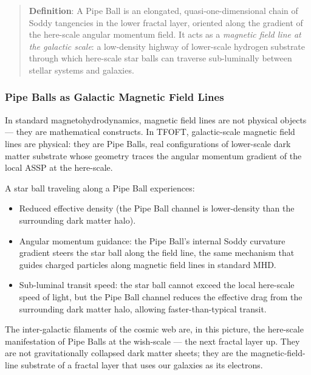   \begin{quote}
  \textbf{Definition}: A Pipe Ball is an elongated, quasi-one-dimensional chain
  of Soddy tangencies in the lower fractal layer, oriented along the gradient of
  the here-scale angular momentum field. It acts as a \emph{magnetic field line
  at the galactic scale}: a low-density highway of lower-scale hydrogen substrate
  through which here-scale star balls can traverse sub-luminally between stellar
  systems and galaxies.
  \end{quote}

  \subsubsection{Pipe Balls as Galactic Magnetic Field Lines}

    In standard magnetohydrodynamics, magnetic field lines are not physical objects
    --- they are mathematical constructs. In TFOFT, galactic-scale magnetic field
    lines are physical: they are Pipe Balls, real configurations of lower-scale
    dark matter substrate whose geometry traces the angular momentum gradient of
    the local ASSP at the here-scale.

    A star ball traveling along a Pipe Ball experiences:
    \begin{itemize}
      \item Reduced effective density (the Pipe Ball channel is lower-density than
            the surrounding dark matter halo).
      \item Angular momentum guidance: the Pipe Ball's internal Soddy curvature
            gradient steers the star ball along the field line, the same mechanism
            that guides charged particles along magnetic field lines in standard
            MHD.
      \item Sub-luminal transit speed: the star ball cannot exceed the local
            here-scale speed of light, but the Pipe Ball channel reduces the
            effective drag from the surrounding dark matter halo, allowing
            faster-than-typical transit.
    \end{itemize}

    The inter-galactic filaments of the cosmic web are, in this picture, the
    here-scale manifestation of Pipe Balls at the wish-scale --- the next
    fractal layer up. They are not gravitationally collapsed dark matter
    sheets; they are the magnetic-field-line substrate of a fractal layer
    that uses our galaxies as its electrons.


